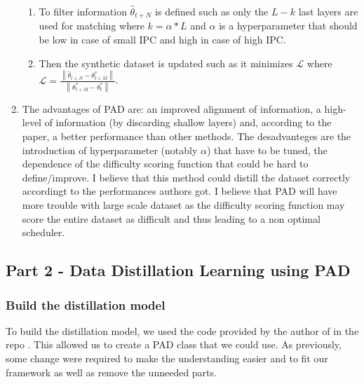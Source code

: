 \documentclass[onecolumn]{IEEEtran}
\begin{document}
\begin{enumerate}[label=(\alph*)]
\begin{enumerate}[label=(\arabic*)]
        \item To filter information $\hat\theta_{t+N}$ is defined such as only the $L-k$ last layers are used for matching where $k=\alpha*L$ and $\alpha$ is a hyperparameter that should be low in case of small IPC and high in case of high IPC.
        \item Then the synthetic dataset is updated such as it minimizes $\mathcal{L}$ where $\mathcal{L}=\frac{\left\|\hat\theta_{t+N}-\theta^*_{t+M}\right\|}{\left\|\theta^*_{t+M}-\theta^*_t\right\|}$.
    \end{enumerate}
    \vspace{3mm}
    \item The advantages of PAD are: an improved alignment of information, a high-level of information (by discarding shallow layers) and, according to the paper, a better performance than other methods. The desadvanteges are the introduction of hyperparameter (notably $\alpha$) that have to be tuned, the dependence of the difficulty scoring function that could be hard to define/improve. I believe that this method could distill the dataset correctly accordingt to the performances authors got. I believe that PAD will have more trouble with large scale dataset as the difficulty scoring function may score the entire dataset as difficult and thus leading to a non optimal scheduler.
\end{enumerate}

\subsection{Part 2 - Data Distillation Learning using PAD}
\subsubsection{Build the distillation model}
To build the distillation model, we used the code provided by the author of \cite{li2024prioritize} in the repo \cite{githubGitHubNUSHPCAILabPAD}. This allowed us to create a PAD class that we could use. As previously, some change were required to make the understanding easier and to fit our framework as well as remove the unneeded parts.



\end{document}
